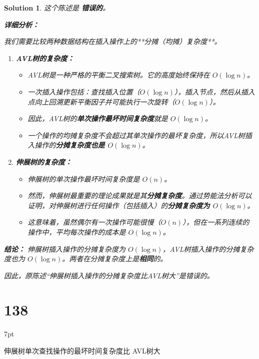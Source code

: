 \documentclass[UTF8]{report}
\newtheorem{solution}{Solution}
\theoremstyle{MyLineTheoremStyle} %
\theoremstyle{MyBlockTheoremStyle} %
\theoremstyle{MySubsubsectionStyle} %
\newenvironment{graybox}{%
        \def\FrameCommand{%
        \hspace{1pt}%
        {\color{gray}\small \vrule width 2pt}%
        {\color{graybox_color}\vrule width 4pt}%
        \colorbox{graybox_color}%
        }%
        \MakeFramed{\advance\hsize-\width\FrameRestore}%
        \noindent\hspace{-4.55pt}%
        \begin{adjustwidth}{}{7pt}%
        \vspace{2pt}\vspace{2pt}%
        }
        {%
        \vspace{2pt}\end{adjustwidth}\endMakeFramed%
        }
\begin{document}
\begin{solution}
这个陈述是 \textbf{错误的}。

\textbf{详细分析：}

我们需要比较两种数据结构在插入操作上的**分摊（均摊）复杂度**。

\begin{enumerate}
    \item \textbf{AVL树的复杂度：}
    \begin{itemize}
        \item AVL树是一种严格的平衡二叉搜索树。它的高度始终保持在 $O(\log n)$。
        \item 一次插入操作包括：查找插入位置（$O(\log n)$），插入节点，然后从插入点向上回溯更新平衡因子并可能执行一次旋转（$O(\log n)$）。
        \item 因此，AVL树的\textbf{单次操作最坏时间复杂度}就是 $O(\log n)$。
        \item 一个操作的均摊复杂度不会超过其单次操作的最坏复杂度，所以AVL树插入操作的\textbf{分摊复杂度也是 $O(\log n)$}。
    \end{itemize}

    \item \textbf{伸展树的复杂度：}
    \begin{itemize}
        \item 伸展树的单次操作最坏时间复杂度是 $O(n)$。
        \item 然而，伸展树最重要的理论成果就是其\textbf{分摊复杂度}。通过势能法分析可以证明，对伸展树进行任何操作（包括插入）的\textbf{分摊复杂度为 $O(\log n)$}。
        \item 这意味着，虽然偶尔有一次操作可能很慢（$O(n)$），但在一系列连续的操作中，平均每次操作的成本是 $O(\log n)$。
    \end{itemize}
\end{enumerate}

\textbf{结论：}
伸展树插入操作的分摊复杂度为 $O(\log n)$，AVL树插入操作的分摊复杂度也为 $O(\log n)$。两者在分摊复杂度上是\textbf{相同}的。

因此，原陈述“伸展树插入操作的分摊复杂度比AVL树大”是错误的。
\end{solution}

\section*{138}
\begin{graybox}
伸展树单次查找操作的最坏时间复杂度比
AVL树大
\end{graybox}
\end{document}
